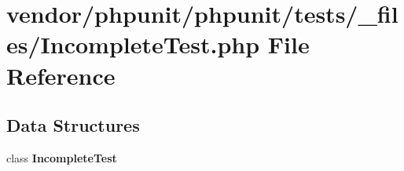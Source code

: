 \section{vendor/phpunit/phpunit/tests/\+\_\+files/\+Incomplete\+Test.php File Reference}
\label{tests_2__files_2_incomplete_test_8php}
\subsection*{Data Structures}
\begin{DoxyCompactItemize}
\item 
class {\bf Incomplete\+Test}
\end{DoxyCompactItemize}
